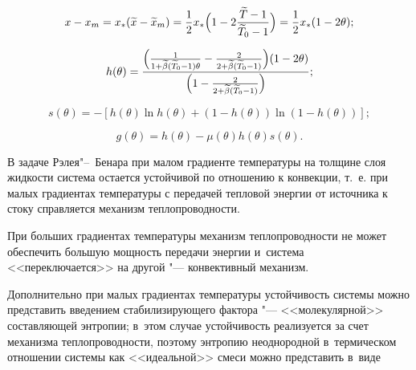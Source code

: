\begin{equation}

x-x_m=x_* (\widetilde{x}-\widetilde{x}_m)=\frac12

x_*\Bigl(1-2\frac{\widetilde{T}-1}{ \widetilde{T}_0-1}\Bigr)=\frac12x_*(1-2\theta);

\label{lukashev:N10}

\end{equation}

\begin{equation}

h(\theta)=

\frac{\Bigl(\frac1{1+\widetilde{\beta} (\widetilde{T}_0-1)\theta}-\frac2{2+\widetilde{\beta} (\widetilde{T}_0-1)}\Bigr)

(1-2\theta)}{\Bigl(1-\frac2{2+\widetilde{\beta} (\widetilde{T}_0-1)}\Bigr)};\label{lukashev:N11}

\end{equation}

\begin{equation}

s(\theta)=-[h(\theta)\ln h(\theta)+(1-h(\theta)) \ln(1-h(\theta))];\label{lukashev:s1}

\end{equation}

\begin{equation}

g(\theta)=h(\theta)-\mu(\theta) h(\theta) s(\theta).\label{lukashev:g1}

\end{equation}



В задаче Рэлея"--~Бенара при малом градиенте температуры на толщине слоя жидкости система остается устойчивой по отношению к конвекции, т.~е. при малых градиентах температуры с передачей тепловой энергии от источника к стоку справляется механизм теплопроводности. 

При больших градиентах температуры механизм теплопроводности не может обеспечить большую мощность передачи энергии и~система <<переключается>> на другой "--- конвективный механизм. 

Дополнительно при малых градиентах температуры устойчивость системы можно представить введением стабилизирующего фактора "--- <<молекулярной>> составляющей энтропии; в~этом случае устойчивость реализуется за счет механизма теплопроводности, поэтому энтропию неоднородной в~термическом отношении системы как <<идеальной>> смеси можно представить в~виде

